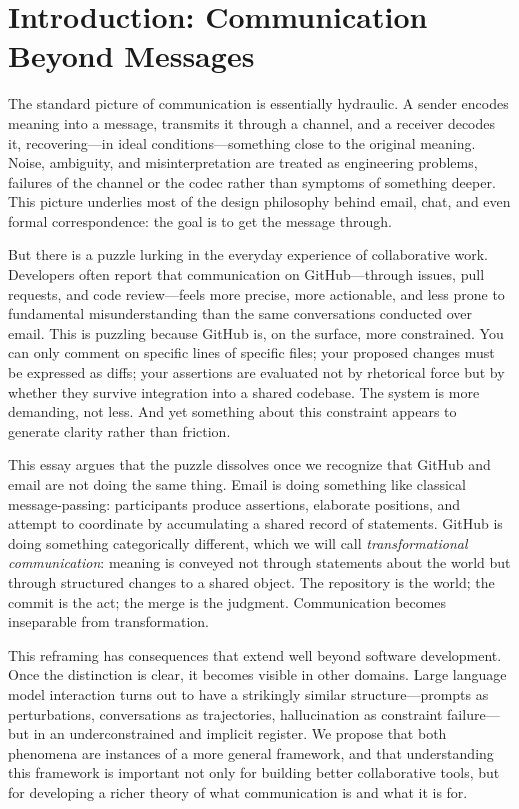 \documentclass[12pt, letterpaper]{article}
\begin{document}
\newpage

\section*{Introduction: Communication Beyond Messages}

The standard picture of communication is essentially hydraulic. A sender encodes meaning into a message, transmits it through a channel, and a receiver decodes it, recovering---in ideal conditions---something close to the original meaning. Noise, ambiguity, and misinterpretation are treated as engineering problems, failures of the channel or the codec rather than symptoms of something deeper. This picture underlies most of the design philosophy behind email, chat, and even formal correspondence: the goal is to get the message through.

But there is a puzzle lurking in the everyday experience of collaborative work. Developers often report that communication on GitHub---through issues, pull requests, and code review---feels more precise, more actionable, and less prone to fundamental misunderstanding than the same conversations conducted over email. This is puzzling because GitHub is, on the surface, more constrained. You can only comment on specific lines of specific files; your proposed changes must be expressed as diffs; your assertions are evaluated not by rhetorical force but by whether they survive integration into a shared codebase. The system is more demanding, not less. And yet something about this constraint appears to generate clarity rather than friction.

This essay argues that the puzzle dissolves once we recognize that GitHub and email are not doing the same thing. Email is doing something like classical message-passing: participants produce assertions, elaborate positions, and attempt to coordinate by accumulating a shared record of statements. GitHub is doing something categorically different, which we will call \emph{transformational communication}: meaning is conveyed not through statements about the world but through structured changes to a shared object. The repository is the world; the commit is the act; the merge is the judgment. Communication becomes inseparable from transformation.

This reframing has consequences that extend well beyond software development. Once the distinction is clear, it becomes visible in other domains. Large language model interaction turns out to have a strikingly similar structure---prompts as perturbations, conversations as trajectories, hallucination as constraint failure---but in an underconstrained and implicit register. We propose that both phenomena are instances of a more general framework, and that understanding this framework is important not only for building better collaborative tools, but for developing a richer theory of what communication is and what it is for.
\end{document}
